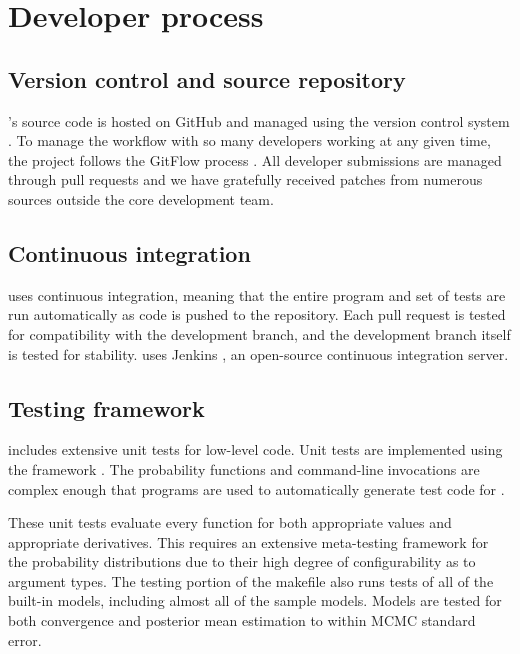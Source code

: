 \documentclass[article]{jss}
\begin{document}
\section{Developer process}

\subsection{Version control and source repository}

's source code is hosted on GitHub and managed using
the  version control system \citep{Chacon:2009}.  To manage
the workflow with so many developers working at any given time, the
project follows the GitFlow process \citep{Driessen:2010}.  All
developer submissions are managed through pull requests and we have
gratefully received patches from numerous sources outside the core
development team.


\subsection{Continuous integration}

 uses continuous integration, meaning that the entire
program and set of tests are run automatically as code is pushed to
the  repository.  Each pull request is tested for
compatibility with the development branch, and the development branch
itself is tested for stability.   uses Jenkins
\citep{Smart:2011}, an open-source continuous integration server.

\subsection{Testing framework}

 includes extensive unit tests for low-level  code.
Unit tests are implemented using the  framework
\citep{GoogleTest:2011}.  The probability functions and command-line
invocations are complex enough that programs are used to automatically
generate test code for .

These unit tests evaluate every function for both appropriate values
and appropriate derivatives.  This requires an extensive meta-testing
framework for the probability distributions due to their high degree
of configurability as to argument types.  The testing portion of the
makefile also runs tests of all of the built-in models, including
almost all of the  sample models.  Models are tested
for both convergence and posterior mean estimation to within MCMC
standard error.
\end{document}
